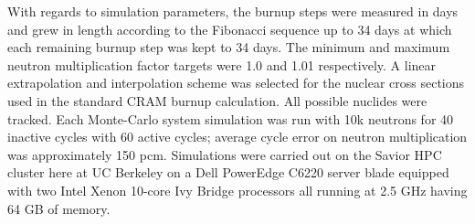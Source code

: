 With regards to simulation parameters, the burnup steps were measured in days
and grew in length according to the Fibonacci sequence up to 34 days at which
each remaining burnup step was kept to 34 days. The minimum and maximum 
neutron multiplication factor targets were 1.0 and 1.01 respectively. A linear
extrapolation and interpolation scheme was selected for the nuclear cross
sections used in the standard CRAM burnup calculation. All possible nuclides
were tracked. Each Monte-Carlo system simulation was run with 10k neutrons for
40 inactive cycles with 60 active cycles; average cycle error on neutron
multiplication was approximately 150 pcm. Simulations were carried out on the
Savior HPC cluster here at UC Berkeley on a Dell PowerEdge C6220 server blade
equipped with two Intel Xenon 10-core Ivy Bridge processors all running at
2.5 GHz having 64 GB of memory.

